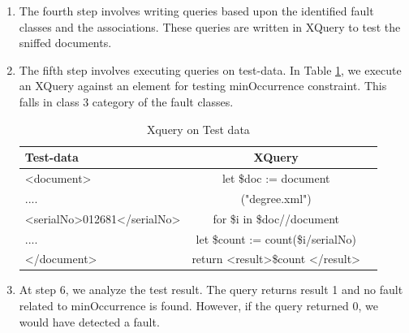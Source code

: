 \documentclass[12pt,a4paper,oneside]{book}
\begin{document}
\begin{enumerate}
		\item The fourth step involves writing queries based upon the identified fault classes and the associations. These queries are written in XQuery to test the sniffed documents. 
		
		
		\item The fifth step involves executing queries on test-data. In Table \ref{tab:xquery-testdata}, we execute an XQuery against an element for testing minOccurrence constraint. This falls in class 3 category of the fault classes. 

\begin{table}[!tbh]
\caption{Xquery on Test data}
\label{tab:xquery-testdata}
\centering
\begin{tabular}[width=\columnwidth]{|p{2.3in}|c|c|}
\hline
Test-data               				& XQuery \\
\hline
\textless document\textgreater 	    	& let \$doc := document \\ 
....	    							& ("degree.xml")  \\
\textless serialNo\textgreater 012681\textless /serialNo\textgreater 	    	& for \$i in \$doc//document   \\
....	    							& let \$count := count(\$i/serialNo)  \\
\textless /document\textgreater	    	&  return \textless result\textgreater {\$count} \textless /result\textgreater  \\
\hline
\end{tabular}
\end{table}
		
		\item At step 6, we analyze the test result. The query returns result 1 and no fault related to minOccurrence is found. However, if the query returned 0, we would have detected a fault. 		
		
	\end{enumerate}

	
\end{document}
